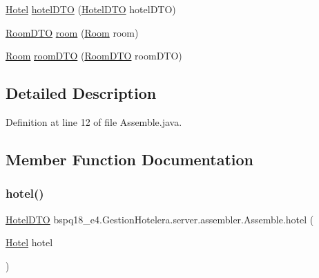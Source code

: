 \begin{DoxyCompactItemize}
\item 
\mbox{\hyperlink{classbspq18__e4_1_1_gestion_hotelera_1_1server_1_1data_1_1_hotel}{Hotel}} \mbox{\hyperlink{classbspq18__e4_1_1_gestion_hotelera_1_1server_1_1assembler_1_1_assemble_a0b6a31d6e1771818d59d43d1b2c69666}{hotel\+D\+TO}} (\mbox{\hyperlink{classbspq18__e4_1_1_gestion_hotelera_1_1server_1_1dto_1_1_hotel_d_t_o}{Hotel\+D\+TO}} hotel\+D\+TO)
\item 
\mbox{\hyperlink{classbspq18__e4_1_1_gestion_hotelera_1_1server_1_1dto_1_1_room_d_t_o}{Room\+D\+TO}} \mbox{\hyperlink{classbspq18__e4_1_1_gestion_hotelera_1_1server_1_1assembler_1_1_assemble_a613192e32d56a88b58f5d637d33b9193}{room}} (\mbox{\hyperlink{classbspq18__e4_1_1_gestion_hotelera_1_1server_1_1data_1_1_room}{Room}} room)
\item 
\mbox{\hyperlink{classbspq18__e4_1_1_gestion_hotelera_1_1server_1_1data_1_1_room}{Room}} \mbox{\hyperlink{classbspq18__e4_1_1_gestion_hotelera_1_1server_1_1assembler_1_1_assemble_a3b6821b9bc902a835ce27af0d9fae754}{room\+D\+TO}} (\mbox{\hyperlink{classbspq18__e4_1_1_gestion_hotelera_1_1server_1_1dto_1_1_room_d_t_o}{Room\+D\+TO}} room\+D\+TO)
\end{DoxyCompactItemize}


\subsection{Detailed Description}


Definition at line 12 of file Assemble.\+java.



\subsection{Member Function Documentation}
\mbox{\label{classbspq18__e4_1_1_gestion_hotelera_1_1server_1_1assembler_1_1_assemble_a31efbae8fbea50786103a46be8f56895}} 
\subsubsection{\texorpdfstring{hotel()}{hotel()}}
{\footnotesize\ttfamily \mbox{\hyperlink{classbspq18__e4_1_1_gestion_hotelera_1_1server_1_1dto_1_1_hotel_d_t_o}{Hotel\+D\+TO}} bspq18\+\_\+e4.\+Gestion\+Hotelera.\+server.\+assembler.\+Assemble.\+hotel (\begin{DoxyParamCaption}\item[{\mbox{\hyperlink{classbspq18__e4_1_1_gestion_hotelera_1_1server_1_1data_1_1_hotel}{Hotel}}}]{hotel }\end{DoxyParamCaption})}




